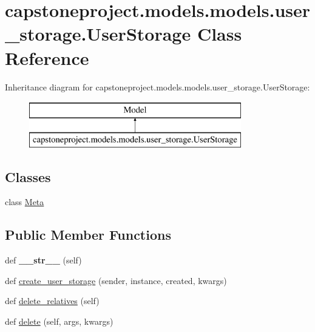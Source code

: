 \hypertarget{classcapstoneproject_1_1models_1_1models_1_1user__storage_1_1_user_storage}{}\section{capstoneproject.\+models.\+models.\+user\+\_\+storage.\+User\+Storage Class Reference}
\label{classcapstoneproject_1_1models_1_1models_1_1user__storage_1_1_user_storage}
Inheritance diagram for capstoneproject.\+models.\+models.\+user\+\_\+storage.\+User\+Storage\+:\begin{figure}[H]
\begin{center}
\leavevmode
\includegraphics[height=2.000000cm]{classcapstoneproject_1_1models_1_1models_1_1user__storage_1_1_user_storage}
\end{center}
\end{figure}
\subsection*{Classes}
\begin{DoxyCompactItemize}
\item 
class \mbox{\hyperlink{classcapstoneproject_1_1models_1_1models_1_1user__storage_1_1_user_storage_1_1_meta}{Meta}}
\end{DoxyCompactItemize}
\subsection*{Public Member Functions}
\begin{DoxyCompactItemize}
\item 
\mbox{\label{classcapstoneproject_1_1models_1_1models_1_1user__storage_1_1_user_storage_a8c5a538b7ce7cc8f2542a2c6ce3674f0}} 
def {\bfseries \+\_\+\+\_\+str\+\_\+\+\_\+} (self)
\item 
def \mbox{\hyperlink{classcapstoneproject_1_1models_1_1models_1_1user__storage_1_1_user_storage_acee64beae981948db0a3decdf8f1033b}{create\+\_\+user\+\_\+storage}} (sender, instance, created, kwargs)
\item 
def \mbox{\hyperlink{classcapstoneproject_1_1models_1_1models_1_1user__storage_1_1_user_storage_a78435bf6aa48eee6d2090e1c7977f000}{delete\+\_\+relatives}} (self)
\item 
def \mbox{\hyperlink{classcapstoneproject_1_1models_1_1models_1_1user__storage_1_1_user_storage_ab0d31f40530cadade0c9304061bcd3e5}{delete}} (self, args, kwargs)
\end{DoxyCompactItemize}
